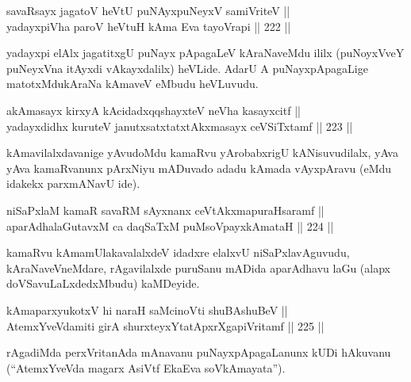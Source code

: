 \begin{shl}
savaRsayx jagatoV heVtU puNAyxpuNeyxV samiVriteV || \\
yadayxpiVha paroV heVtuH kAma Eva tayoVrapi \hfill || 222 ||  
\end{shl}

\begin{artha}
yadayxpi elAlx jagatitxgU puNayx pApagaLeV kAraNaveMdu ililx
(puNoyxVveY puNeyxVna itAyxdi vAkayxdalilx) heVLide. AdarU A
puNayxpApagaLige matotxMdukAraNa kAmaveV eMbudu heVLuvudu.
\end{artha}

\begin{shl}
akAmasayx kirxyA kAcidadxqqshayxteV neVha kasayxcitf || \\
yadayxdidhx kuruteV janutxsatxtatxtAkxmasayx ceVSiTxtamf \hfill || 223 ||  
\end{shl}

\begin{artha}
kAmavilalxdavanige yAvudoMdu kamaRvu yArobabxrigU kANisuvudilalx, yAva
yAva kamaRvanunx pArxNiyu mADuvado adadu kAmada vAyxpAravu (eMdu
idakekx parxmANavU ide).
\end{artha}

\begin{shl}
niSaPxlaM kamaR savaRM sAyxnanx ceVtAkxmapuraHsaramf || \\
aparAdhalaGutavxM ca daqSaTxM puMsoV\s payxkAmataH \hfill || 224 ||  
\end{shl}

\begin{artha}
kamaRvu kAma\s mUlakavalalxdeV idadxre elalxvU niSaPxlavAguvudu,
kAraNaveVneMdare, rAgavilalxde puruSanu mADida aparAdhavu laGu (alapx
doVSavuLaLxdedxMbudu) kaMDeyide.
\end{artha}

\begin{shl}
kAmaparxyukotxV hi naraH saMcinoVti shuBAshuBeV || \\
AtemxYveVdamiti girA shurxteyxYtatApxrXgapiVritamf \hfill || 225 ||  
\end{shl}

\begin{artha}
rAgadiMda perxVritanAda mAnavanu puNayxpApagaLanunx kUDi hAkuvanu (``AtemxYveVda magarx AsiVtf EkaEva soV\s kAmayata'').
\end{artha}


